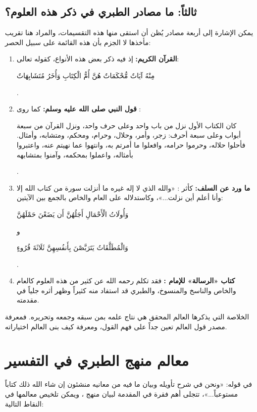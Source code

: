 \subsection{ثالثاً: ما مصادر الطبري في ذكر هذه العلوم؟}
يمكن الإشارة إلى أربعة مصادر يُظن أن  استقى منها هذه التقسيمات، والمراد هنا تقريب مأخذها لا الجزم بأن هذه القائمة على سبيل الحصر:
\begin{enumerate}
    \item \textbf{القرآن الكريم:} إذ فيه ذكر بعض هذه الأنواع، كقوله تعالى: \begin{ayah}مِنْهُ آيَاتٌ مُّحْكَمَاتٌ هُنَّ أُمُّ الْكِتَابِ وَأُخَرُ مُتَشَابِهَاتٌ\end{ayah}.
    \item \textbf{قول النبي صلى الله عليه وسلم:} كما روى : \begin{hadith}كان الكتاب الأول نزل من باب واحد وعلى حرف واحد، ونزل القرآن من سبعة أبواب وعلى سبعة أحرف: زجر، وأمر، وحلال، وحرام، ومحكم، ومتشابه، وأمثال. فأحلوا حلاله، وحرموا حرامه، وافعلوا ما أمرتم به، وانتهوا عما نهيتم عنه، واعتبروا بأمثاله، واعملوا بمحكمه، وآمنوا بمتشابهه\end{hadith}.
    \item \textbf{ما ورد عن السلف:} كأثر : «والله الذي لا إله غيره ما أنزلت سورة من كتاب الله إلا وأنا أعلم أين نزلت...»، وكاستدلاله على العام والخاص بالجمع بين الآيتين: \begin{ayah}وَأُولَاتُ الْأَحْمَالِ أَجَلُهُنَّ أَن يَضَعْنَ حَمْلَهُنَّ\end{ayah} و \begin{ayah}وَالْمُطَلَّقَاتُ يَتَرَبَّصْنَ بِأَنفُسِهِنَّ ثَلَاثَةَ قُرُوءٍ\end{ayah}.
    \item \textbf{كتاب «الرسالة» للإمام :} فقد تكلم  رحمه الله عن كثير من هذه العلوم كالعام والخاص والناسخ والمنسوخ، والطبري قد استفاد منه كثيراً وظهر أثره جلياً في مقدمته.
\end{enumerate}

\begin{fawaid}
الخلاصة التي يذكرها العالم المحقق هي نتاج علمه بمن سبقه وجمعه وتحريره. فمعرفة مصدر قول العالم تعين جداً على فهم القول، ومعرفة كيف بنى العالم اختياراته.
\end{fawaid}

\separator

\section{معالم منهج الطبري في التفسير}
في قوله: «ونحن في شرح تأويله وبيان ما فيه من معانيه منشئون إن شاء الله ذلك كتاباً مستوعباً...»، تتجلى أهم فقرة في المقدمة لبيان منهج ، ويمكن تلخيص معالمها في النقاط التالية:

